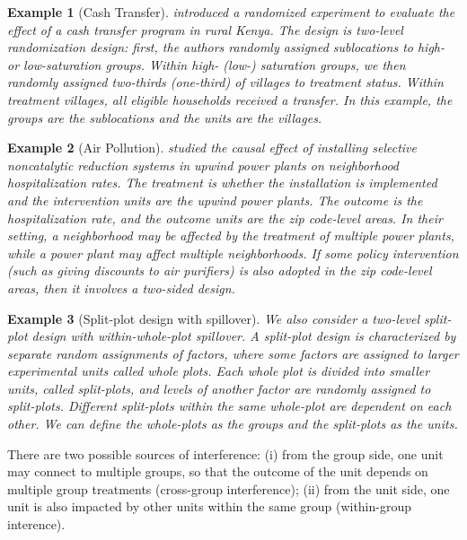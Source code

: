 \documentclass{article}
\newtheorem{example}{Example}
\begin{document}
\begin{example}[Cash Transfer]
\label{exmp::egger}
    \cite{egger2022general} introduced a randomized experiment to evaluate the effect of a cash transfer program in rural Kenya. The design is two-level randomization design: first, the authors 
    randomly assigned sublocations to high- or low-saturation groups. Within high- (low-) saturation groups, we then randomly assigned two-thirds (one-third) of villages to treatment status. Within treatment villages, all eligible households received a transfer. In this example, the groups are the sublocations and the units are the villages. 
\end{example} 

\begin{example}[Air Pollution]
\label{exmp::power_plant}
    \cite{zigler2021bipartite} studied the causal effect of installing selective noncatalytic reduction systems in upwind power plants on neighborhood hospitalization rates. The treatment is whether the installation is implemented and the intervention units are the upwind power plants. The outcome is the hospitalization rate, and the outcome units are the zip code-level areas. In their setting, a neighborhood may be affected by the treatment of multiple power plants, while a power plant may affect multiple neighborhoods. If some policy intervention (such as giving discounts to air purifiers) is also adopted in the zip code-level areas, then it involves a two-sided design.  
\end{example} 



\begin{example}[Split-plot design with spillover]
\label{exmp::split_plot}
    We also consider a two-level split-plot design with within-whole-plot spillover. A split-plot design is characterized by separate random assignments of factors, where some factors are assigned to larger experimental units called whole plots. Each whole plot is divided into smaller units, called split-plots, and levels of another factor are randomly assigned to split-plots. Different split-plots within the same whole-plot are dependent on each other. 
    We can define the whole-plots as the groups and the split-plots as the units. 
\end{example} 
There are two possible sources of interference: (i) from the group side, one unit may connect to multiple groups, so that the outcome of the unit depends on multiple group treatments (cross-group interference); (ii) from the unit side, one unit is also impacted by other units within the same group (within-group interence).  
\end{document}
